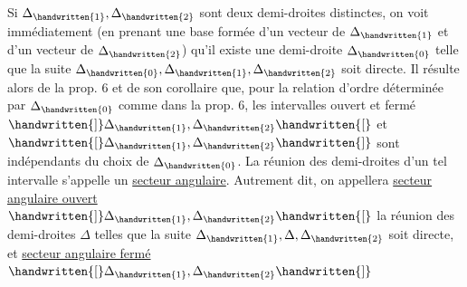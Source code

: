 Si $\Delta_{\handwritten{1}},\Delta_{\handwritten{2}}$ sont deux demi-droites distinctes, on voit immédiatement (en prenant une base formée d'un vecteur de $\Delta_{\handwritten{1}}$ et d'un vecteur de $\Delta_{\handwritten{2}}$) qu'il existe une demi-droite $\Delta_{\handwritten{0}}$ telle que la suite $\Delta_{\handwritten{0}},\Delta_{\handwritten{1}},\Delta_{\handwritten{2}}$ soit directe. Il résulte alors de la prop. 6 et de son corollaire que, pour la relation d'ordre déterminée par $\Delta_{\handwritten{0}}$ comme dans la prop. 6, les intervalles ouvert et fermé $\handwritten{]}\Delta_{\handwritten{1}},\Delta_{\handwritten{2}}\handwritten{[}$ et $\handwritten{[}\Delta_{\handwritten{1}},\Delta_{\handwritten{2}}\handwritten{]}$ sont indépendants du choix de $\Delta_{\handwritten{0}}$. La réunion des demi-droites d'un tel intervalle s'appelle un \uline{secteur angulaire}. Autrement dit, on appellera \uline{secteur angulaire ouvert} $\handwritten{]}\Delta_{\handwritten{1}},\Delta_{\handwritten{2}}\handwritten{[}$ la réunion des demi-droites $\Delta$ telles que la suite $\Delta_{\handwritten{1}},\Delta,\Delta_{\handwritten{2}}$ soit directe, et \uline{secteur angulaire fermé} $\handwritten{[}\Delta_{\handwritten{1}},\Delta_{\handwritten{2}}\handwritten{]}$
